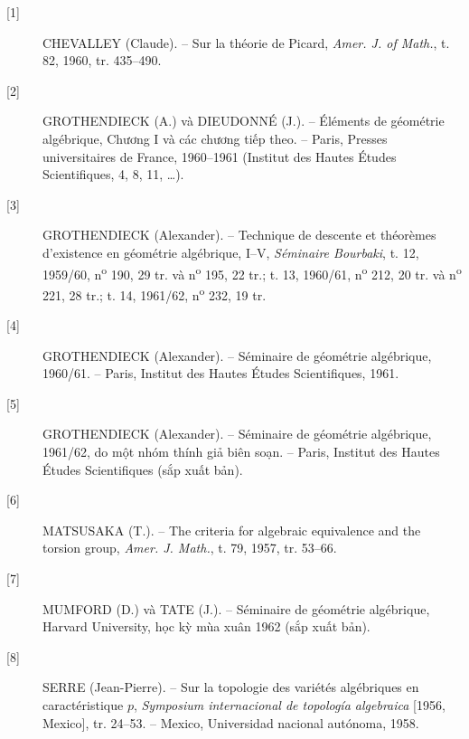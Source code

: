 \begin{description}
\item[{[1]}] CHEVALLEY (Claude). -- Sur la théorie de Picard,
\emph{Amer. J. of Math.}, t. 82, 1960, tr. 435--490.

\item[{[2]}] GROTHENDIECK (A.) và DIEUDONNÉ (J.). -- Éléments de géométrie
algébrique, Chương I và các chương tiếp theo. -- Paris, Presses universitaires
de France, 1960--1961 (Institut des Hautes Études Scientifiques, 4, 8, 11,
\ldots).

\item[{[3]}] GROTHENDIECK (Alexander). -- Technique de descente et théorèmes
d'existence en géométrie algébrique, I--V, \emph{Séminaire Bourbaki}, t. 12,
1959/60, n\textsuperscript{o} 190, 29 tr. và n\textsuperscript{o} 195, 22 tr.;
t. 13, 1960/61, n\textsuperscript{o} 212, 20 tr. và
n\textsuperscript{o} 221, 28 tr.; t. 14, 1961/62,
n\textsuperscript{o} 232, 19 tr.

\item[{[4]}] GROTHENDIECK (Alexander). -- Séminaire de géométrie algébrique,
1960/61. -- Paris, Institut des Hautes Études Scientifiques, 1961.

\item[{[5]}] GROTHENDIECK (Alexander). -- Séminaire de géométrie algébrique,
1961/62, do một nhóm thính giả biên soạn. -- Paris, Institut des Hautes Études
Scientifiques (sắp xuất bản).

\item[{[6]}] MATSUSAKA (T.). -- The criteria for algebraic equivalence and the
torsion group, \emph{Amer. J. Math.}, t. 79, 1957, tr. 53--66.

\item[{[7]}] MUMFORD (D.) và TATE (J.). -- Séminaire de géométrie algébrique,
Harvard University, học kỳ mùa xuân 1962 (sắp xuất bản).

\item[{[8]}] SERRE (Jean-Pierre). -- Sur la topologie des variétés algébriques
en caractéristique $p$, \emph{Symposium internacional de topología algebraica}
[1956, Mexico], tr. 24--53. -- Mexico, Universidad nacional autónoma, 1958.
\end{description}
